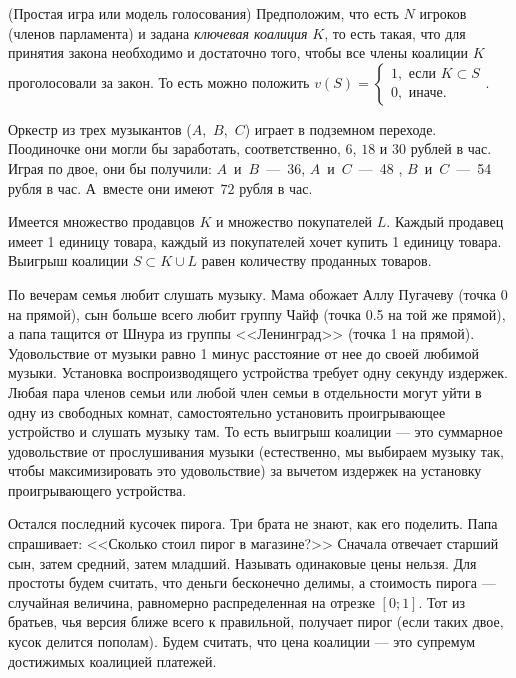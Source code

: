 \documentclass[a4paper,12pt]{article}
\begin{document}
  (Простая игра или модель голосования)
 Предположим, что есть $N$ игроков (членов парламента) и задана {\it ключевая коалиция} $K$, то есть такая, что для принятия закона необходимо и достаточно того, чтобы все члены коалиции $K$ проголосовали за закон. То есть можно положить $v(S) = \begin{cases} 1, \text{ если } K \subset S \\ 0, \text{ иначе.} \end{cases}$.


  Оркестр из трех музыкантов
($A$,~$B$,~$C$) играет в подземном переходе. Поодиночке они
могли бы заработать, соответственно, $6$, $18$ и $30$
рублей в час. Играя по двое, они бы получили:
$A$~и~$B$~---~36, $A$~и~$C$~---~48 , $B$~и~$C$~---~54 рубля в час.
А~вместе они имеют~$72$ рубля в час.

 Имеется множество продавцов $K$ и множество покупателей $L$. Каждый продавец имеет 1 единицу товара, каждый из покупателей хочет купить 1 единицу товара. Выигрыш коалиции $S \subset K\cup L$ равен количеству проданных товаров.

По вечерам семья любит слушать музыку. Мама обожает Аллу Пугачеву (точка 0 на прямой), сын больше всего любит группу Чайф (точка 0.5 на той же прямой), а папа тащится от Шнура из группы <<Ленинград>> (точка 1 на прямой). Удовольствие от музыки равно 1 минус расстояние от нее до своей любимой музыки.
Установка воспроизводящего устройства требует одну секунду издержек. Любая пара членов семьи или любой член семьи в отдельности могут уйти в одну из свободных комнат, самостоятельно установить проигрывающее устройство и слушать музыку там. То есть выигрыш коалиции --- это суммарное удовольствие от прослушивания музыки (естественно, мы выбираем музыку так, чтобы максимизировать это удовольствие) за вычетом издержек на установку проигрывающего устройства. 

\label{pirog} Остался последний кусочек пирога. Три брата не знают, как его поделить. Папа спрашивает: <<Сколько стоил пирог в магазине?>> Сначала отвечает старший сын, затем средний, затем младший. Называть одинаковые цены нельзя. Для простоты будем считать, что деньги бесконечно делимы, а стоимость пирога --- случайная величина, равномерно распределенная на отрезке $[0;1]$. Тот из братьев, чья версия ближе всего к правильной, получает пирог (если таких двое, кусок делится пополам). Будем считать, что цена коалиции --- это супремум достижимых коалицией платежей.
\end{document}
